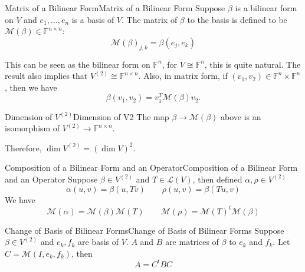 \documentclass[../main.tex]{subfiles}
\begin{document}
\begin{definition}{Matrix of a Bilinear Form}{Matrix of a Bilinear Form}
Suppose $\beta$ is a bilinear form on $V$ and $e_1, \ldots ,e_n$ is a basis of $V$. The matrix of $\beta$ to the basis is defined to be $\mathscr{M}(\beta) \in \mathbb{F}^{n \times n}$:
\begin{equation*}
\mathscr{M}(\beta) _{j,k} = \beta(e_j,e_k)
\end{equation*}
\end{definition}
This can be seen as the bilinear form on $\mathbb{F}^{n}$, for $V\cong \mathbb{F}^{n}$, this is quite natural. The result also implies that $V^{(2)}\cong \mathbb{F}^{n \times n}$. Also, in matrix form, if $(v_1,v_2)\in \mathbb{F}^{n}\times \mathbb{F}^{n}$, then we have
\begin{equation*}
\beta(v_1,v_2) = v_1^T \mathscr{M}(\beta) v_2.
\end{equation*}

\begin{corollary}{Dimension of $V^{(2)}$}{Dimension of V2}
The map $\beta \rightarrow \mathscr{M}(\beta)$ above is an isomorphism of $V^{(2)}\rightarrow \mathbb{F}^{n \times n}$.

Therefore, $\dim V^{(2)} = (\dim V)^2$.
\end{corollary}

\begin{proposition}{Composition of a Bilinear Form and an Operator}{Composition of a Bilinear Form and an Operator}
Suppose $\beta\in V^{(2)}$ and $T\in \mathscr{L}(V)$, then defined $\alpha,\rho\in V^{(2)}$
\begin{equation*}
\alpha(u,v) = \beta(u,Tv)\qquad \rho(u,v) = \beta(Tu,v)
\end{equation*}
We have
\begin{equation*}
\mathscr{M}(\alpha) = \mathscr{M}(\beta)\mathscr{M}(T) \qquad \mathscr{M}(\rho) = \mathscr{M}(T)^t \mathscr{M}(\beta)
\end{equation*}
\end{proposition}

\begin{proposition}{Change of Basis of Bilinear Forms}{Change of Basis of Bilinear Forms}
Suppose $\beta\in V^{(2)}$ and $e_k,f_k$ are basis of $V$. $A$ and $B$ are matrices of $\beta$ to $e_k$ and $f_k$. Let $C = \mathscr{M}(I,e_k,f_k)$, then
\begin{equation}
A = C^tBC
\end{equation}
\end{proposition}
\end{document}
